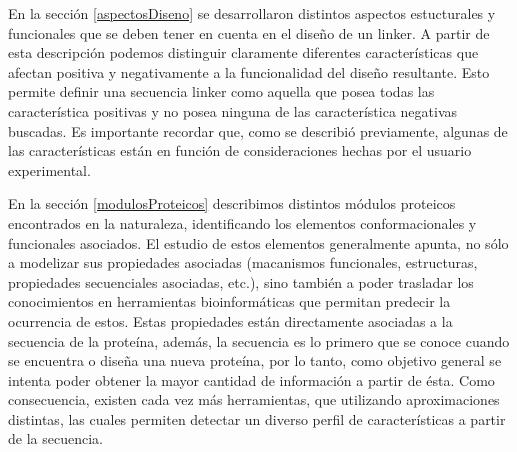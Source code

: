 % 
% 
% 





En la sección \ref{aspectosDiseno} se desarrollaron distintos aspectos estucturales y funcionales que se deben tener en cuenta en el diseño de un linker.
A partir de esta descripción podemos distinguir claramente diferentes características que afectan positiva y negativamente a la funcionalidad del diseño resultante.
Esto permite definir una secuencia linker como aquella que posea todas las característica positivas y no posea ninguna de las característica negativas buscadas.
Es importante recordar que, como se describió previamente, algunas de las características están en función de consideraciones hechas por el usuario experimental.

En la sección \ref{modulosProteicos} describimos distintos módulos proteicos encontrados en la naturaleza, identificando los elementos conformacionales y funcionales asociados.
El estudio de estos elementos generalmente apunta, no sólo a modelizar sus propiedades asociadas (macanismos funcionales, estructuras, propiedades secuenciales asociadas, etc.), 
sino también a poder trasladar los conocimientos en herramientas bioinformáticas que permitan predecir la ocurrencia de estos.
Estas propiedades están directamente asociadas a la secuencia de la proteína, además, la secuencia es lo primero que se conoce cuando se encuentra o diseña una nueva proteína, por lo tanto,  
como objetivo general se intenta poder obtener la mayor cantidad de información a partir de ésta.
Como consecuencia, existen cada vez más herramientas, que utilizando aproximaciones distintas, las cuales permiten detectar un diverso perfil de características a partir de la secuencia.

